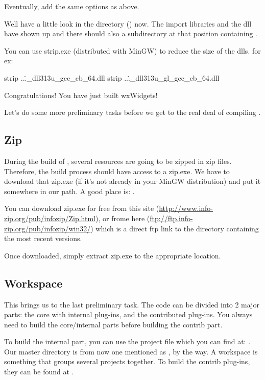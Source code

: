 Eventually, add the same options as above.

Well have a little look in the directory () now. The import libraries and the dll have shown up and there should also a  subdirectory at that position containing .

You can use strip.exe (distributed with MinGW) to reduce the size of the dlls.
for ex:
\begin{cmd}
strip ..\..\lib\gcc_dll\wxmsw313u_gcc_cb_64.dll
strip ..\..\lib\gcc_dll\wxmsw313u_gl_gcc_cb_64.dll
\end{cmd}

Congratulations! You have just built wxWidgets!

Let's do some more preliminary tasks before we get to the real deal of compiling \codeblocks.

\subsection{Zip}

During the build of \codeblocks, several resources are going to be zipped in zip files. Therefore, the build process should have access to a zip.exe. We have to download that zip.exe (if it's not already in your MinGW distribution) and put it somewhere in our path. A good place is: .

You can download zip.exe for free from this site (\url{http://www.info-zip.org/pub/infozip/Zip.html}), or frome here (\url{ftp://ftp.info-zip.org/pub/infozip/win32/}) which is a direct ftp link to the directory containing the most recent versions.

Once downloaded, simply extract zip.exe to the appropriate location.

\subsection{Workspace}
This brings us to the last preliminary task. The \codeblocks code can be divided into 2 major parts: the core with internal plug-ins, and the contributed plug-ins. You always need to build the core/internal parts before building the contrib part.

To build the internal part, you can use the \codeblocks project file which you can find at: . Our \codeblocks master directory is from now one mentioned as , by the way. A workspace is something that groups several projects together. To build the contrib plug-ins, they can be found at .

